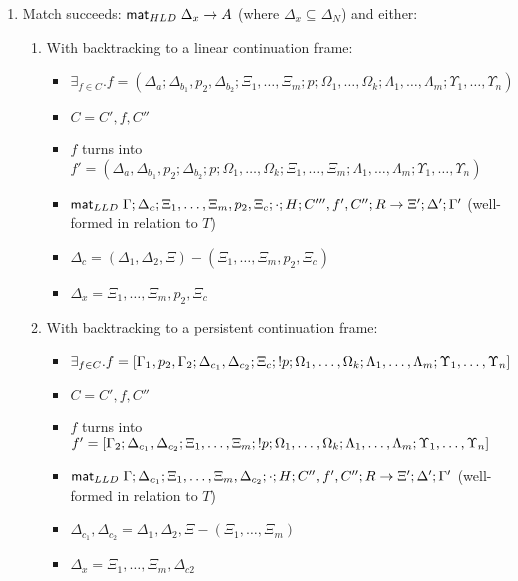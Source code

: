 {\begin{lemma}
\begin{enumerate}
   \item Match succeeds: $\mathsf{mat}_{HLD} \; \Delta_x \rightarrow A$ (where $\Delta_x \subseteq
         \Delta_N$) and either:

   \begin{enumerate}
      \item With backtracking to a linear continuation frame:
      \begin{itemize}
         \item $\exists_{f \in C}. f = (\Delta_a; \Delta_{b_1}, p_2, \Delta_{b_2}; \Xi_1,
               \dotsc, \Xi_m; p; \Omega_1, \dotsc, \Omega_k; \Lambda_1, \dotsc,
               \Lambda_m; \Upsilon_1, \dotsc, \Upsilon_n)$
         \item $C = C', f, C''$
         \item $f$ turns into $f' = (\Delta_a,
               \Delta_{b_1}, p_2; \Delta_{b_2}; p; \Omega_1, \dotsc, \Omega_k;
               \Xi_1, \dotsc, \Xi_m; \Lambda_1, \dotsc, \Lambda_m; \Upsilon_1,
               \dotsc, \Upsilon_n)$
         \item $\mathsf{mat}_{LLD} \; \Gamma; \Delta_c; \Xi_1, \dotsc, \Xi_m, p_2, \Xi_c; \cdot; H;
         C''', f', C''; R \rightarrow \Xi'; \Delta'; \Gamma'$ (well-formed in
               relation to $T$)
         \item $\Delta_c = (\Delta_1, \Delta_2, \Xi) - (\Xi_1, \dotsc, \Xi_m, p_2, \Xi_c)$
         \item $\Delta_x = \Xi_1, \dotsc, \Xi_m, p_2, \Xi_c$
      \end{itemize}

      \item With backtracking to a persistent continuation frame:
      \begin{itemize}
         \item $\exists_{f \in C}. f = [\Gamma_1, p_2, \Gamma_2; \Delta_{c_1},
            \Delta_{c_2}; \Xi_c; {!} p; \Omega_1, \dotsc, \Omega_k; \Lambda_1,
            \dotsc, \Lambda_m; \Upsilon_1, \dotsc, \Upsilon_n]$
         \item $C = C', f, C''$
         \item $f$ turns into $f' = [\Gamma_2; \Delta_{c_1}, \Delta_{c_2};
            \Xi_1, \dotsc, \Xi_m; {!} p; \Omega_1, \dotsc, \Omega_k;
            \Lambda_1, \dotsc, \Lambda_m;
            \Upsilon_1, \dotsc, \Upsilon_n]$

         \item $\mathsf{mat}_{LLD} \; \Gamma; \Delta_{c_1}; \Xi_1, \dotsc, \Xi_m, \Delta_{c_2};
\cdot; H; C'', f', C''; R \rightarrow \Xi'; \Delta'; \Gamma'$ (well-formed in
      relation to $T$)
         \item $\Delta_{c_1}, \Delta_{c_2} = \Delta_1, \Delta_2, \Xi - (\Xi_1, \dotsc, \Xi_m)$
         \item $\Delta_x = \Xi_1, \dotsc, \Xi_m, \Delta_{c2}$
      \end{itemize}
   \end{enumerate}
\end{enumerate}
\end{lemma}

}
